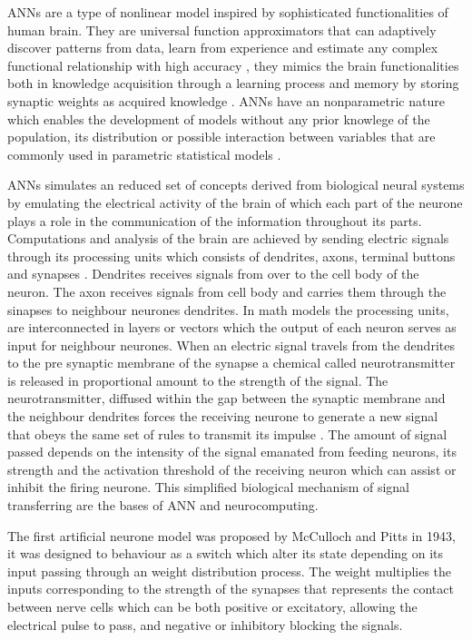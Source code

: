 ANNs are a type of nonlinear model inspired by sophisticated functionalities of human brain. They are universal function approximators that can adaptively discover patterns from data, learn from experience and estimate any complex functional relationship with high accuracy \cite{zhang1998linear, wang2003artificial}, they mimics the brain functionalities both in knowledge acquisition through a learning process and memory by storing synaptic weights as acquired knowledge \cite{ferraudo}. ANNs have an nonparametric nature which enables the development of models without any prior knowlege of the population, its distribution or possible interaction between variables that are commonly used in parametric statistical models \cite{walczak2019artificial}.

ANNs simulates an reduced set of concepts derived from biological neural systems by emulating the electrical activity of the brain of which each part of the neurone plays a role in the communication of the information throughout its parts. Computations and analysis of the brain are achieved by sending electric signals through its processing units which consists of dendrites, axons, terminal buttons and synapses \cite{krogh2008artificial}. Dendrites receives signals from over to the cell body of the neuron. The axon receives signals from cell body and carries them through the sinapses to neighbour neurones dendrites. In math models the processing units, are interconnected in layers or vectors which the output of each neuron serves as input for neighbour neurones. When an electric signal travels from the dendrites to the pre synaptic membrane of the synapse a chemical called neurotransmitter is released in proportional amount to the strength of the signal. The neurotransmitter, diffused within the gap between the synaptic membrane and the neighbour dendrites forces the receiving neurone to generate a new signal that obeys the same set of rules to transmit its impulse \cite{basheer2000artificial}. The amount of signal passed depends on the intensity of the signal emanated from feeding neurons, its strength and the activation threshold of the receiving neuron which can assist or inhibit the firing neurone. This simplified biological mechanism of signal transferring are the bases of ANN and neurocomputing.

The first artificial neurone model was proposed by McCulloch and Pitts in 1943, it was designed to behaviour as a switch which alter its state depending on its input passing through an weight distribution process. The weight multiplies the inputs corresponding to the strength of the synapses that represents the contact between nerve cells \cite{mcculloch1943logical} which can be both positive or excitatory, allowing the electrical pulse to pass, and negative or inhibitory blocking the signals. 

